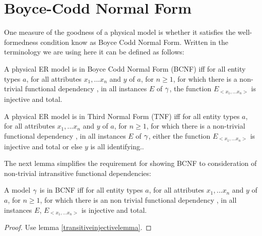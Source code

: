 \section{Boyce-Codd Normal Form}
\noindent One measure of the goodness of a physical model is whether it satisfies the well-formedness condition know as Boyce Codd Normal Form.
Written in the terminology we are using here it can be defined as follows:
\begin{definition} %
A physical ER model is in Boyce Codd Normal Form (BCNF)  iff
for all entity types $a$, for all attributes $x_1,...x_n$ and $y$ of $a$, for $n \geq 1$, 
for which  there is a non-trivial functional dependency , 
in all instances $E$  of $\gamma$, the function $E_{<x_1,...x_n>}$ is injective and total.  
\end{definition}

\begin{definition} %
A physical ER model is in Third Normal Form (TNF)  iff
for all entity types $a$, for all attributes $x_1,...x_n$ and $y$ of $a$, for $n \geq 1$, 
for which  there is a non-trivial functional dependency , 
in all instances $E$  of $\gamma$, either the function $E_{<x_1,...x_n>}$ is injective and total
or else $y$ is all identifying..  
\end{definition}

\noindent The next lemma simplifies the requirement for showing BCNF to consideration of non-trivial
intransitive functional dependencies:
\begin{lemma}
\label{BCNFsublemma}
A model $\gamma$ is in BCNF iff
for all entity types $a$, for all attributes $x_1,...x_n$ and $y$ of $a$, for $n \geq 1$, 
for which there is an non trivial  functional dependency ,
in all instances $E$, $E_{<x_1,...x_n>}$ is injective and total. 
\end{lemma}
\begin{proof}Use lemma \ref{transitiveinjectivelemma}.
\end{proof}

